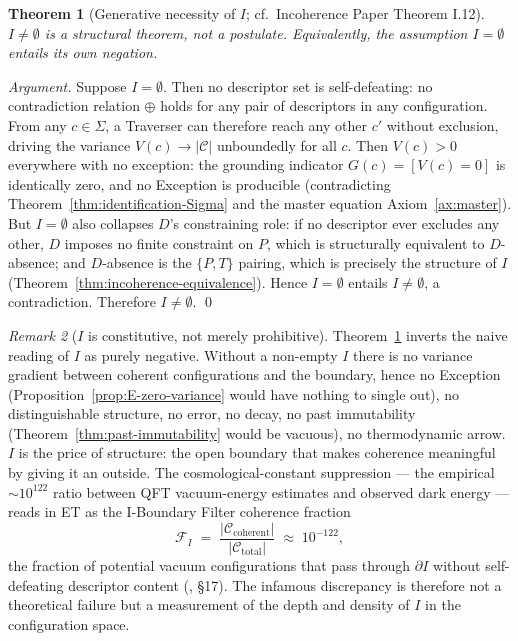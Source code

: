 \documentclass[11pt,a4paper]{article}
\newtheorem{theorem}{Theorem}[section]
\theoremstyle{definition}
\theoremstyle{remark}
\newtheorem{remark}[theorem]{Remark}
\begin{document}
\begin{theorem}[Generative necessity of $I$; cf.\ Incoherence Paper Theorem I.12]\label{thm:I-generative}
$I \neq \emptyset$ is a structural theorem, not a postulate. Equivalently, the assumption $I = \emptyset$ entails its own negation.
\end{theorem}

\begin{proof}[Argument]
Suppose $I = \emptyset$. Then no descriptor set is self-defeating: no contradiction relation $\oplus$ holds for any pair of descriptors in any configuration. From any $c \in \Sigma$, a Traverser can therefore reach any other $c'$ without exclusion, driving the variance $V(c) \to |\mathcal{C}|$ unboundedly for all $c$. Then $V(c) > 0$ everywhere with no exception: the grounding indicator $G(c) = [V(c) = 0]$ is identically zero, and no Exception is producible (contradicting Theorem~\ref{thm:identification-Sigma} and the master equation Axiom~\ref{ax:master}). But $I = \emptyset$ also collapses $D$'s constraining role: if no descriptor ever excludes any other, $D$ imposes no finite constraint on $P$, which is structurally equivalent to $D$-absence; and $D$-absence is the $\{P,T\}$ pairing, which is precisely the structure of $I$ (Theorem~\ref{thm:incoherence-equivalence}). Hence $I = \emptyset$ entails $I \neq \emptyset$, a contradiction. Therefore $I \neq \emptyset$. \qed
\end{proof}

\begin{remark}[$I$ is constitutive, not merely prohibitive]\label{rem:I-constitutive}
Theorem~\ref{thm:I-generative} inverts the naive reading of $I$ as purely negative. Without a non-empty $I$ there is no variance gradient between coherent configurations and the boundary, hence no Exception (Proposition~\ref{prop:E-zero-variance} would have nothing to single out), no distinguishable structure, no error, no decay, no past immutability (Theorem~\ref{thm:past-immutability} would be vacuous), no thermodynamic arrow. $I$ is the price of structure: the open boundary that makes coherence meaningful by giving it an outside. The cosmological-constant suppression --- the empirical $\sim 10^{122}$ ratio between QFT vacuum-energy estimates and observed dark energy --- reads in ET as the I-Boundary Filter coherence fraction
\[
\mathcal{F}_{I} \;=\; \frac{|\mathcal{C}_{\mathrm{coherent}}|}{|\mathcal{C}_{\mathrm{total}}|} \;\approx\; 10^{-122},
\]
the fraction of potential vacuum configurations that pass through $\partial I$ without self-defeating descriptor content (\cite{Muller-IncoherencePaper}, \S 17). The infamous discrepancy is therefore not a theoretical failure but a measurement of the depth and density of $I$ in the configuration space.
\end{remark}
\end{document}
